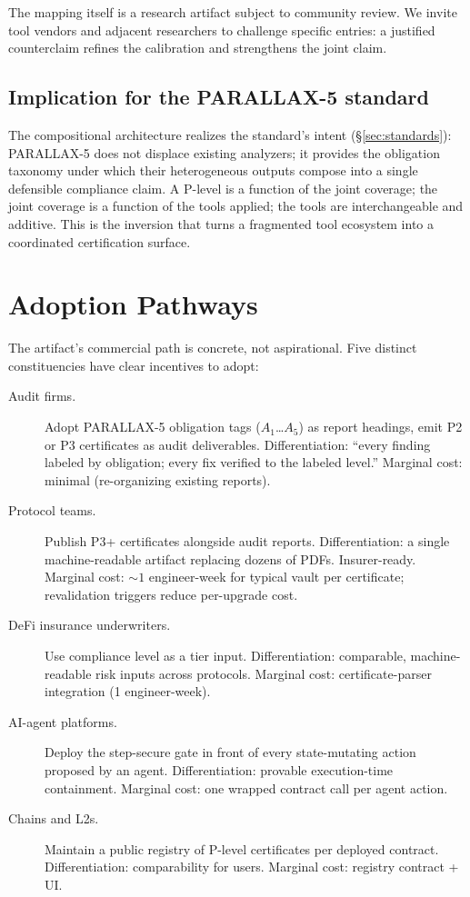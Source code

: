 \documentclass[11pt,a4paper]{article}
\begin{document}
The mapping itself is a research artifact subject to community review. We invite tool vendors and adjacent researchers to challenge specific entries: a justified counterclaim refines the calibration and strengthens the joint claim.

\subsection{Implication for the PARALLAX-5 standard}

The compositional architecture realizes the standard's intent (\S\ref{sec:standards}): PARALLAX-5 does not displace existing analyzers; it provides the obligation taxonomy under which their heterogeneous outputs compose into a single defensible compliance claim. A P-level is a function of the joint coverage; the joint coverage is a function of the tools applied; the tools are interchangeable and additive. This is the inversion that turns a fragmented tool ecosystem into a coordinated certification surface.


\section{Adoption Pathways}\label{sec:adoption}

The artifact's commercial path is concrete, not aspirational. Five distinct constituencies have clear incentives to adopt:

\begin{description}
  \item[Audit firms.] Adopt PARALLAX-5 obligation tags ($A_1$\ldots$A_5$) as report headings, emit P2 or P3 certificates as audit deliverables. Differentiation: ``every finding labeled by obligation; every fix verified to the labeled level.'' Marginal cost: minimal (re-organizing existing reports).
  \item[Protocol teams.] Publish P3+ certificates alongside audit reports. Differentiation: a single machine-readable artifact replacing dozens of PDFs. Insurer-ready. Marginal cost: $\sim 1$ engineer-week for typical vault per certificate; revalidation triggers reduce per-upgrade cost.
  \item[DeFi insurance underwriters.] Use compliance level as a tier input. Differentiation: comparable, machine-readable risk inputs across protocols. Marginal cost: certificate-parser integration (1 engineer-week).
  \item[AI-agent platforms.] Deploy the step-secure gate in front of every state-mutating action proposed by an agent. Differentiation: provable execution-time containment. Marginal cost: one wrapped contract call per agent action.
  \item[Chains and L2s.] Maintain a public registry of P-level certificates per deployed contract. Differentiation: comparability for users. Marginal cost: registry contract + UI.
\end{description}
\end{document}
